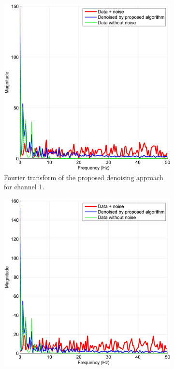 \documentclass[onecolumn, groupedaddress, 10pt]{revtex4-1}
\begin{document}
\begin{figure}[H]
	\centering
	\begin{subfigure}{.5\textwidth}
  		\centering
  		\includegraphics[scale=0.06]{denoise_1.jpg}
  		\caption{\label{fig:denoise_1} Fourier transform of the proposed denoising approach for channel 1.}
	\end{subfigure}%
	\begin{subfigure}{.5\textwidth}
  		\centering
  		\includegraphics[scale=0.06]{denoise_2.jpg}

\end{subfigure}
\end{figure}
\end{document}
